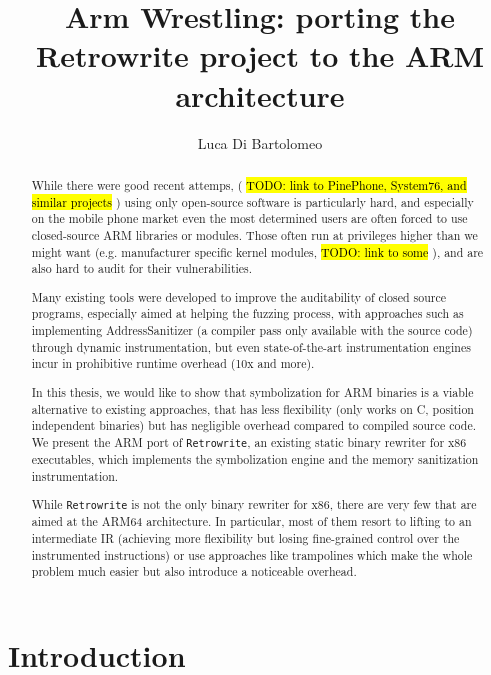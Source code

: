 \documentclass[a4paper,11pt,oneside]{report}
\title{Arm Wrestling: porting the Retrowrite project to the ARM architecture}
\author{Luca Di Bartolomeo} \adviser{Prof. Mathias Payer (EPFL)}
\newcommand{\todo}[1]{%
	\begingroup 
	\sethlcolor{cyan}%
	\hl{TODO: #1}%
	\endgroup
}
\begin{document}
 \maketitle \makededication \makeacks


\begin{abstract}

	While there were good recent attemps, (\todo{link to PinePhone, System76,
	and similar projects}) using only open-source software is particularly
	hard, and especially on the mobile phone market even the most determined
	users are often forced to use closed-source ARM libraries or modules.  
	Those often run at privileges higher than we might want (e.g. manufacturer
	specific kernel modules, \todo{link to some}), and are also hard to audit
	for their vulnerabilities. 

	Many existing tools were developed to improve the auditability of closed
	source programs, especially aimed at helping the fuzzing process, with
	approaches such as implementing AddressSanitizer (a compiler pass only
	available with the source code) through dynamic instrumentation, but even
	state-of-the-art instrumentation engines incur in prohibitive runtime
	overhead (10x and more). 

	In this thesis, we would like to show that symbolization for ARM binaries 
	is a viable alternative to existing approaches, that has less flexibility 
	(only works on C, position independent binaries) but has
	negligible overhead compared to compiled source code. We present the ARM
	port of \texttt{Retrowrite}, an existing static binary rewriter for x86
	executables, which implements the symbolization engine and the memory
	sanitization instrumentation. 

	While \texttt{Retrowrite} is not the only binary rewriter for x86, there 
	are very few that are aimed at the ARM64 architecture. In particular, most 
	of them resort to lifting to an intermediate IR (achieving more flexibility 
	but losing fine-grained control over the instrumented instructions) or use 
	approaches like trampolines which make the whole problem much easier but 
	also introduce a noticeable overhead.


\end{abstract}


\maketoc

\chapter{Introduction}
\end{document}
